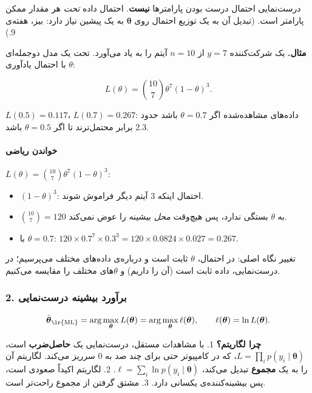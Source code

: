 درست‌نمایی احتمال درست بودن پارامترها \textbf{نیست}. احتمال داده
\emph{تحت} هر مقدار ممکن پارامتر است. (تبدیل آن به یک توزیع احتمال روی
\(\boldsymbol\theta\) به یک پیشین نیاز دارد: بیز، هفته‌ی 9.)

\textbf{مثال.} یک شرکت‌کننده \(y = 7\) از \(n = 10\) آیتم را به یاد
می‌آورد. تحت یک مدل دوجمله‌ای با احتمال یادآوری \(\theta\):

\[
L(\theta) = \binom{10}{7}\theta^{7}(1-\theta)^{3}.
\]

\(L(0.5) = 0.117\)، \(L(0.7) = 0.267\): داده‌های مشاهده‌شده اگر
\(\theta = 0.7\) باشد حدود 2.3 برابر محتمل‌ترند تا اگر \(\theta = 0.5\)
باشد.

\paragraph{خواندن ریاضی}

\(L(\theta) = \binom{10}{7}\theta^{7}(1-\theta)^{3}\):

\begin{itemize}
\tightlist
\item
  \((1-\theta)^3\): احتمال اینکه 3 آیتم دیگر فراموش شوند.
\item
  \(\binom{10}{7} = 120\) به \(\theta\) بستگی ندارد، پس هیچ‌وقت
  \emph{محل} بیشینه را عوض نمی‌کند.
\item
  با \(\theta = 0.7\):
  \(120 \times 0.7^7 \times 0.3^3 = 120 \times 0.0824 \times 0.027 = 0.267\).
\end{itemize}

تغییر نگاه اصلی: در احتمال، \(\theta\) ثابت است و درباره‌ی داده‌های مختلف
می‌پرسیم؛ در درست‌نمایی، داده ثابت است (آن را داریم) و \(\theta\)های مختلف
را مقایسه می‌کنیم.

\subsubsection{2. برآورد بیشینه درست‌نمایی}

\[
\hat{\boldsymbol\theta}_{\text{\lr{ML}}} = \arg\max_{\boldsymbol\theta} L(\boldsymbol\theta) = \arg\max_{\boldsymbol\theta} \ell(\boldsymbol\theta),
\qquad \ell(\boldsymbol\theta) = \ln L(\boldsymbol\theta).
\]

\textbf{چرا لگاریتم؟} 1. با مشاهدات مستقل، درست‌نمایی یک \textbf{حاصل‌ضرب}
است، \(L = \prod_i p(y_i\mid\boldsymbol\theta)\)، که در کامپیوتر حتی
برای چند صد  به 0 سرریز  می‌کند. لگاریتم آن را
به یک \textbf{مجموع} تبدیل می‌کند،
\(\ell = \sum_i \ln p(y_i\mid\boldsymbol\theta)\). 2. لگاریتم اکیداً
صعودی است، پس بیشینه‌کننده‌ی یکسانی دارد. 3. مشتق گرفتن از مجموع راحت‌تر
است.

